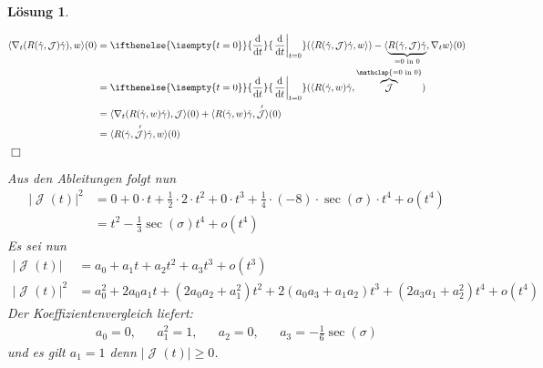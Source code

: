 \documentclass[paper=A4, twoside, chapterprefix=true, bibliography=totoc, headsepline]{scrbook}
\DeclareMathOperator{\calJ}{\mathcal{J}}
\newcommand{\dop}{\mathrm{d}}
\newcommand{\difffrac}[3][]{\ifthenelse{\isempty{#1}}{\frac{\dop #2}{\dop #3}}{\left. \frac{\dop #2}{\dop #3} \right|_{#1}}}
\theoremstyle{plain}
\theoremstyle{nonumberplain}
\theoremstyle{empty}
\theoremstyle{break}
\newtheorem{Loes}{L\"osung}
\begin{document}
\begin{Loes}
\begin{description}[leftmargin=*]
\begin{align*}
	\langle \nabla_t (R(\dot\gamma, \calJ) \dot\gamma), w \rangle (0) &= \difffrac[t=0]{}{t} ( \langle R(\dot\gamma, \calJ) \dot\gamma, w \rangle) - \langle \underbrace{R(\dot\gamma, \calJ) \dot\gamma}_{= 0 \text{ in } 0}, \nabla_t w \rangle (0) \\
	&= \difffrac[t=0]{}{t} ( \langle R(\dot\gamma, w) \dot\gamma, \overbrace{\calJ}^{\mathclap{=0 \text{ in } 0}}) \\
	&= \langle \nabla_t ( R(\dot\gamma, w) \dot\gamma), \calJ \rangle (0) + \langle R(\dot\gamma, w) \dot\gamma, \calJ' \rangle (0) \\
	&= \langle R(\dot\gamma, \calJ') \dot\gamma, w \rangle (0)
\end{align*}
\hfill\ensuremath{\Box}
\end{description}
Aus den Ableitungen folgt nun
\begin{align*}
	|\calJ(t)|^2 &= 0 + 0 \cdot t + \frac{1}{2} \cdot 2 \cdot t^2 + 0 \cdot t^3 + \frac{1}{4} \cdot (-8) \cdot \sec(\sigma) \cdot t^4 + o(t^4) \\
	&= t^2 - \frac{1}{3} \sec(\sigma) t^4 + o(t^4) 
\end{align*}
Es sei nun
\begin{align*}
	|\calJ(t)| &= a_0 + a_1 t + a_2 t^2 + a_3 t^3 + o(t^3) \\
	|\calJ(t)|^2 &= a_0^2 + 2 a_0 a_1 t + (2 a_0 a_2 + a_1^2) t^2 + 2( a_0a_3 + a_1 a_2) t^3 + (2 a_3 a_1 + a_2^2) t^4 + o(t^4)
\end{align*}
Der Koeffizientenvergleich liefert:
\begin{align*}
	a_0 = 0, && a_1^2 = 1, && a_2 = 0, && a_3 = -\frac{1}{6} \sec(\sigma)
\end{align*}
und es gilt $a_1 = 1$ denn $|\calJ(t)| \ge 0$.
\end{Loes}
\end{document}
